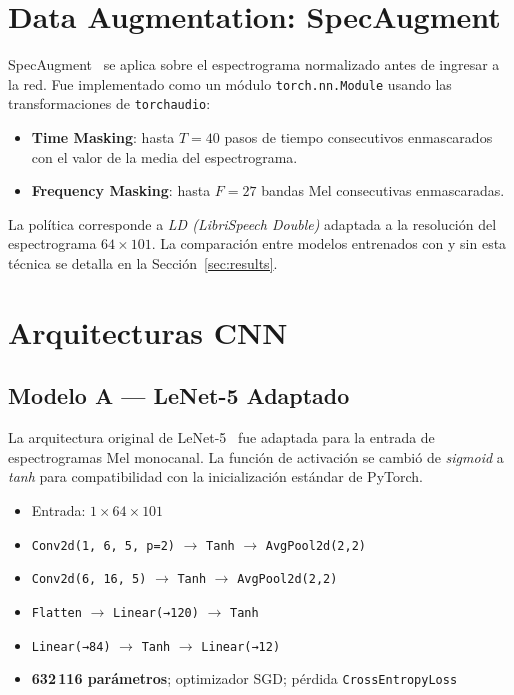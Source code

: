 \documentclass[conference]{IEEEtran}
\begin{document}
\section{Data Augmentation: SpecAugment}

SpecAugment~\cite{park2019specaugment} se aplica sobre el espectrograma
normalizado antes de ingresar a la red.  Fue implementado como un módulo
\texttt{torch.nn.Module} usando las transformaciones de \texttt{torchaudio}:

\begin{itemize}
  \item \textbf{Time Masking}: hasta $T = 40$ pasos de tiempo consecutivos
        enmascarados con el valor de la media del espectrograma.
  \item \textbf{Frequency Masking}: hasta $F = 27$ bandas Mel consecutivas
        enmascaradas.
\end{itemize}

La política corresponde a \textit{LD (LibriSpeech Double)} adaptada a la
resolución del espectrograma $64 \times 101$.  La comparación entre modelos
entrenados con y sin esta técnica se detalla en la Sección~\ref{sec:results}.

\section{Arquitecturas CNN}

\subsection{Modelo A — LeNet-5 Adaptado}

La arquitectura original de LeNet-5~\cite{lecun1998lenet} fue adaptada para la
entrada de espectrogramas Mel monocanal.  La función de activación se cambió de
\textit{sigmoid} a \textit{tanh} para compatibilidad con la inicialización
estándar de PyTorch.

\begin{itemize}
  \item Entrada: $1 \times 64 \times 101$
  \item \texttt{Conv2d(1,\,6,\,5,\,p=2)} $\rightarrow$ \texttt{Tanh} $\rightarrow$ \texttt{AvgPool2d(2,2)}
  \item \texttt{Conv2d(6,\,16,\,5)} $\rightarrow$ \texttt{Tanh} $\rightarrow$ \texttt{AvgPool2d(2,2)}
  \item \texttt{Flatten} $\rightarrow$ \texttt{Linear(→120)} $\rightarrow$ \texttt{Tanh}
  \item \texttt{Linear(→84)} $\rightarrow$ \texttt{Tanh} $\rightarrow$ \texttt{Linear(→12)}
  \item \textbf{632\,116 parámetros}; optimizador SGD; pérdida \texttt{CrossEntropyLoss}
\end{itemize}
\end{document}
